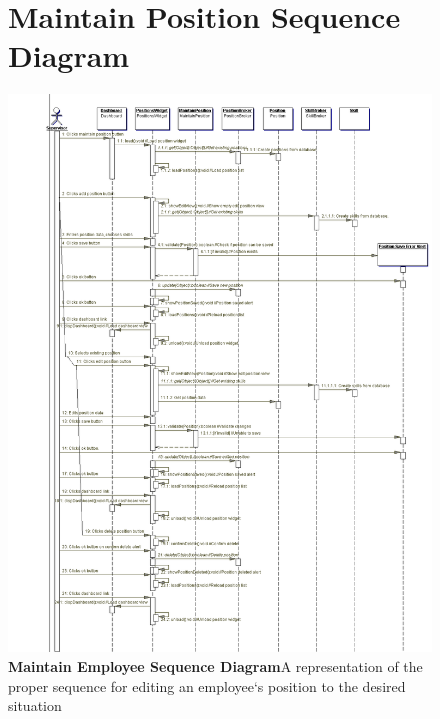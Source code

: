 \documentclass[letterpaper,12pt]{report}
\begin{document}
\begin{figure}[hbp]
 \section{Maintain Position Sequence Diagram}
 \includegraphics[scale=0.45]{externals/MaintainPositionSequence.png}
 \caption{\small
\textbf{Maintain Employee Sequence Diagram}\newline A representation of the proper sequence for editing an employee`s position to the desired situation}\label{fig:seqMaintEmp}
\end{figure}
\newpage
\end{document}
